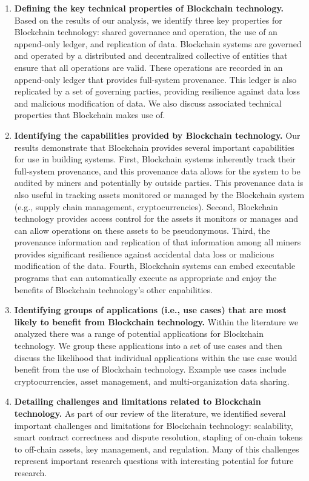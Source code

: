 \begin{enumerate}
	\item \textbf{Defining the key technical properties of Blockchain technology.}
	Based on the results of our analysis, we identify three key properties for Blockchain technology: shared governance and operation, the use of an append-only ledger, and replication of data.
	Blockchain systems are governed and operated by a distributed and decentralized collective of entities that ensure that all operations are valid.
	These operations are recorded in an append-only ledger that provides full-system provenance.
	This ledger is also replicated by a set of governing parties, providing resilience against data loss and malicious modification of data.
	We also discuss associated technical properties that Blockchain makes use of.
	
	\item \textbf{Identifying the capabilities provided by Blockchain technology.}
	Our results demonstrate that Blockchain provides several important capabilities for use in building  systems.
	First, Blockchain systems inherently track their full-system provenance, and this provenance data allows for the system to be audited by miners and potentially by outside parties.
	This provenance data is also useful in tracking assets monitored or managed by the Blockchain system (e.g., supply chain management, cryptocurrencies).
	Second, Blockchain technology provides access control for the assets it monitors or manages and can allow operations on these assets to be pseudonymous.
	Third, the provenance information and replication of that information among all miners provides significant resilience against accidental data loss or malicious modification of the data.
	Fourth, Blockchain systems can embed executable programs that can automatically execute as appropriate and enjoy the benefits of Blockchain technology's other capabilities.
	
	\item \textbf{Identifying groups of applications (i.e., use cases) that are most likely to benefit from Blockchain technology.}
	Within the literature we analyzed there was a range of potential applications for Blockchain technology.
	We group these applications into a set of use cases and then discuss the likelihood that individual applications within the use case would benefit from the use of Blockchain technology.
	Example use cases include cryptocurrencies, asset management, and multi-organization data sharing.
	
	\item \textbf{Detailing challenges and limitations related to Blockchain technology.}
	As part of our review of the literature, we identified several important challenges and limitations for Blockchain technology: scalability, smart contract correctness and dispute resolution, stapling of on-chain tokens to off-chain assets, key management, and regulation.
	Many of this challenges represent important research questions with interesting potential for future research.


\end{enumerate}
